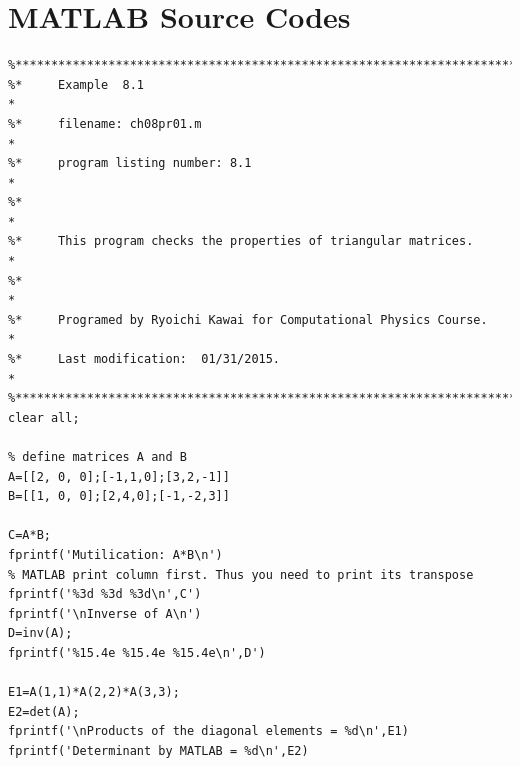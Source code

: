 \begin{enumerate}[labelwidth=0.5cm,labelindent=0cm,leftmargin=*,label=\bfseries \thechapter.\arabic*,align=left]
[Solve $\pdv{x_1} U(x_1,x_2,x_3) = 0$, $\pdv{x_2} U(x_1,x_2,x_3) = 0$, and $\pdv{x_3} U(x_1,x_2,x_3) = 0$ for $x_1$, $x_2$, and $x_3$.]
\end{enumerate}

\vfill

\newpage
\section*{MATLAB Source Codes}

\bigskip
\noindent
\program
\label{prog:triangular_matrix}
\footnotesize
\begin{verbatim}
%**************************************************************************
%*     Example  8.1                                                       *
%*     filename: ch08pr01.m                                               *
%*     program listing number: 8.1                                        *
%*                                                                        *
%*     This program checks the properties of triangular matrices.         *
%*                                                                        *
%*     Programed by Ryoichi Kawai for Computational Physics Course.       *
%*     Last modification:  01/31/2015.                                    *
%**************************************************************************
clear all;

% define matrices A and B
A=[[2, 0, 0];[-1,1,0];[3,2,-1]]
B=[[1, 0, 0];[2,4,0];[-1,-2,3]]

C=A*B;
fprintf('Mutilication: A*B\n')
% MATLAB print column first. Thus you need to print its transpose
fprintf('%3d %3d %3d\n',C')
fprintf('\nInverse of A\n')
D=inv(A);
fprintf('%15.4e %15.4e %15.4e\n',D')

E1=A(1,1)*A(2,2)*A(3,3);
E2=det(A);
fprintf('\nProducts of the diagonal elements = %d\n',E1)
fprintf('Determinant by MATLAB = %d\n',E2)
\end{verbatim}
\normalsize



